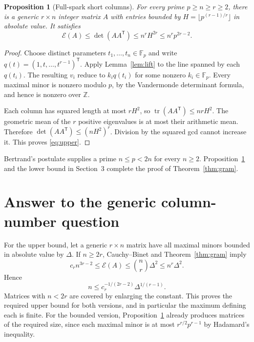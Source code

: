 \documentclass[11pt]{article}
\newtheorem{proposition}[theorem]{Proposition}
\theoremstyle{remark}\newtheorem{remark}[theorem]{Remark}
\newcommand{\Z}{\mathbb Z}\newcommand{\R}{\mathbb R}\newcommand{\F}{\mathbb F}
\newcommand{\tr}{\operatorname{tr}}
\begin{document}
\begin{proposition}[Full-spark short columns]\label{prop:curve}
For every prime $p\ge n\ge r\ge2$, there is a generic $r\times n$ integer matrix $A$ with entries bounded by $H=\lfloor p^{(r-1)/r}\rfloor$ in absolute value. It satisfies
\begin{equation}\label{eq:upper}
 \mathcal E(A)\le\det(AA^{\mathsf T})\le n^r H^{2r}\le n^r p^{2r-2}.
\end{equation}
\end{proposition}
\begin{proof}
Choose distinct parameters $t_1,\ldots,t_n\in\F_p$ and write $q(t)=(1,t,\ldots,t^{r-1})^{\mathsf T}$. Apply Lemma~\ref{lem:lift} to the line spanned by each $q(t_i)$. The resulting $v_i$ reduce to $k_iq(t_i)$ for some nonzero $k_i\in\F_p$. Every maximal minor is nonzero modulo $p$, by the Vandermonde determinant formula, and hence is nonzero over $\Z$.

Each column has squared length at most $rH^2$, so $\tr(AA^{\mathsf T})\le nrH^2$. The geometric mean of the $r$ positive eigenvalues is at most their arithmetic mean. Therefore $\det(AA^{\mathsf T})\le(nH^2)^r$. Division by the squared gcd cannot increase it. This proves \eqref{eq:upper}.
\end{proof}

Bertrand's postulate supplies a prime $n\le p<2n$ for every $n\ge2$. Proposition~\ref{prop:curve} and the lower bound in Section~3 complete the proof of Theorem~\ref{thm:gram}.

\section{Answer to the generic column-number question}
For the upper bound, let a generic $r\times n$ matrix have all maximal minors bounded in absolute value by $\Delta$. If $n\ge2r$, Cauchy--Binet and Theorem~\ref{thm:gram} imply
\[
 c_r n^{3r-2}\le\mathcal E(A)\le \binom nr\Delta^2\le n^r\Delta^2.
\]
Hence
\begin{equation}\label{eq:gupper}
 n\le c_r^{-1/(2r-2)}\Delta^{1/(r-1)}.
\end{equation}
Matrices with $n<2r$ are covered by enlarging the constant. This proves the required upper bound for both versions, and in particular the maximum defining each is finite. For the bounded version, Proposition~\ref{prop:curve} already produces matrices of the required size, since each maximal minor is at most $r^{r/2}p^{r-1}$ by Hadamard's inequality.
\end{document}
